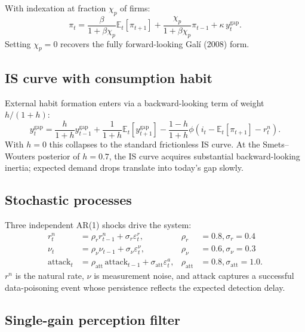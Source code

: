 \documentclass[12pt]{article}
\begin{document}
With \citet{gali1999} indexation at fraction \(\chi_p\) of firms:
\begin{equation}
\pi_t = \frac{\beta}{1 + \beta \chi_p} \mathbb{E}_t[\pi_{t+1}] + \frac{\chi_p}{1 + \beta \chi_p} \pi_{t-1} + \kappa \, y^{\text{gap}}_t.
\end{equation}
Setting \(\chi_p = 0\) recovers the fully forward-looking Galí (2008) form.

\subsection{IS curve with consumption habit}

External habit formation enters via a backward-looking term of weight \(h/(1+h)\):
\begin{equation}
y^{\text{gap}}_t = \frac{h}{1 + h} y^{\text{gap}}_{t-1} + \frac{1}{1+h} \mathbb{E}_t[y^{\text{gap}}_{t+1}] - \frac{1 - h}{1 + h} \phi \left(i_t - \mathbb{E}_t[\pi_{t+1}] - r^n_t\right).
\end{equation}
With \(h = 0\) this collapses to the standard frictionless IS curve. At the Smets--Wouters posterior of \(h = 0.7\), the IS curve acquires substantial backward-looking inertia; expected demand drops translate into today's gap slowly.

\subsection{Stochastic processes}

Three independent AR(1) shocks drive the system:
\begin{align}
r^n_t &= \rho_r r^n_{t-1} + \sigma_{r} \varepsilon^r_t, & \rho_r &= 0.8, \sigma_r = 0.4 \\
\nu_t &= \rho_\nu \nu_{t-1} + \sigma_{\nu} \varepsilon^\nu_t, & \rho_\nu &= 0.6, \sigma_\nu = 0.3 \\
\text{attack}_t &= \rho_{\text{att}} \, \text{attack}_{t-1} + \sigma_{\text{att}} \varepsilon^a_t, & \rho_{\text{att}} &= 0.8, \sigma_{\text{att}} = 1.0.
\end{align}
\(r^n\) is the natural rate, \(\nu\) is measurement noise, and \(\text{attack}\) captures a successful data-poisoning event whose persistence reflects the expected detection delay.

\subsection{Single-gain perception filter}
\end{document}
